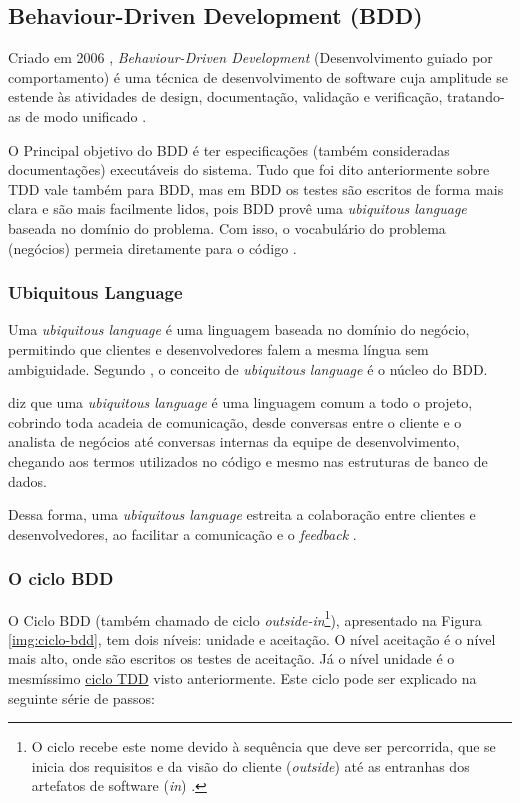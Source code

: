 \subsection{Behaviour-Driven Development (BDD)}
\label{sub:bdd}

Criado em 2006 \cite{IntroducingBDD}, \textit{Behaviour-Driven Development} (Desenvolvimento guiado por comportamento) é uma técnica de desenvolvimento de software cuja amplitude se estende às atividades de design, documentação, validação e verificação, tratando-as de modo unificado \cite{BDDRodrigo}.

O Principal objetivo do BDD é ter especificações (também consideradas documentações) executáveis do sistema. Tudo que foi dito anteriormente sobre TDD vale também para BDD, mas em BDD os testes são escritos de forma mais clara e são mais facilmente lidos, pois BDD provê uma \textit{ubiquitous language} baseada no domínio do problema. Com isso, o vocabulário do problema (negócios) permeia diretamente para o código \cite{IntroducingBDD}.

\subsubsection{Ubiquitous Language}
\label{ssub:ubiquitous_language}

Uma \textit{ubiquitous language} é uma linguagem baseada no domínio do negócio, permitindo que clientes e desenvolvedores falem a mesma língua sem ambiguidade. Segundo , o conceito de \textit{ubiquitous language} é o núcleo do BDD.


 diz que uma \textit{ubiquitous language} é uma linguagem comum a todo o projeto, cobrindo toda acadeia de comunicação, desde conversas entre o cliente e o analista de negócios até conversas internas da equipe de desenvolvimento, chegando aos termos utilizados no código e mesmo nas estruturas de banco de dados.

Dessa forma, uma \textit{ubiquitous language} estreita a colaboração entre clientes e desenvolvedores, ao facilitar a comunicação e o \textit{feedback} \cite{DDD}.

\subsubsection{O ciclo BDD}
\label{ssub:o_ciclo_bdd}

O Ciclo BDD (também chamado de ciclo \textit{outside-in}\footnote{O ciclo recebe este nome devido à sequência que deve ser percorrida, que se inicia dos requisitos e da visão do cliente (\textit{outside}) até as entranhas dos artefatos de software (\textit{in}) \cite{BDDRodrigo}.}), apresentado na Figura \ref{img:ciclo-bdd}, tem dois níveis: unidade e aceitação. O nível aceitação é o nível mais alto, onde são escritos os testes de aceitação. Já o nível unidade é o mesmíssimo \hyperref[ssub:ciclo_tdd]{ciclo TDD} visto anteriormente. Este ciclo pode ser explicado na seguinte série de passos:

